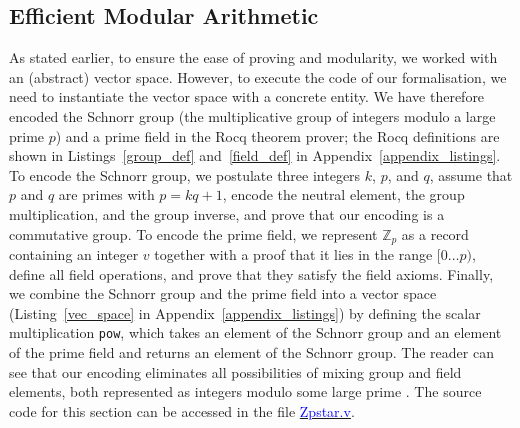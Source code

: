 \documentclass[sigconf,anonymous,review]{acmart}
\begin{document}
\subsection{Efficient Modular Arithmetic}\label{eff_mod_arith}
As stated earlier, to ensure the ease of proving and modularity, we worked with an (abstract) vector space. However, to execute the code of our formalisation, we need to instantiate the vector space with a concrete entity. We have therefore encoded the Schnorr group \cite{schnorr1991efficient} (the multiplicative group of integers modulo a large prime $p$) and a prime field in the Rocq theorem prover; the Rocq definitions are shown in Listings~\ref{group_def} and~\ref{field_def} in Appendix~\ref{appendix_listings}. To encode the Schnorr group, we postulate three integers $k$, $p$, and $q$, assume that $p$ and $q$ are primes with $p = k q + 1$, encode the neutral element, the group multiplication, and the group inverse, and prove that our encoding is a commutative group. To encode the prime field, we represent $\mathbb{Z}_p$ as a record containing an integer $v$ together with a proof that it lies in the range $[0 \ldots p)$, define all field operations, and prove that they satisfy the field axioms. Finally, we combine the Schnorr group and the prime field into a vector space (Listing~\ref{vec_space} in Appendix~\ref{appendix_listings}) by defining the scalar multiplication \texttt{pow}, which takes an element of the Schnorr group and an element of the prime field and returns an element of the Schnorr group. The reader can see that our encoding eliminates all possibilities of mixing group and field elements, both represented as integers modulo some large prime \cite{10.1007/978-3-662-63958-0_24}. The source code for this section can be accessed in the file \href{https://anonymous.4open.science/r/SigmaProtocol-EBA5/src/Utility/Zpstar.v}{\textcolor{blue}{Zpstar.v}}.
\end{document}
